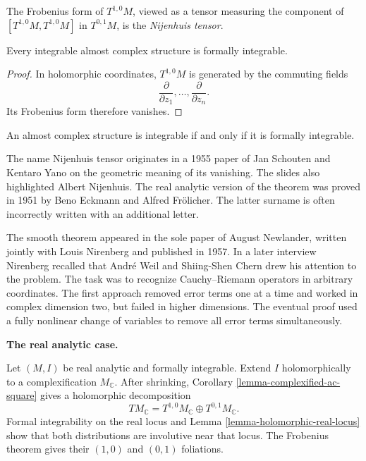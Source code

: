 \begin{definition}
\label{definition-nijenhuis-tensor}
The Frobenius form of $T^{1,0}M$, viewed as
a tensor measuring the component of
$[T^{1,0}M,T^{1,0}M]$ in $T^{0,1}M$, is the
{\it Nijenhuis tensor}.
\end{definition}

\begin{proposition}
\label{proposition-integrable-formal}
Every integrable almost complex structure is
formally integrable.
\end{proposition}

\begin{proof}
In holomorphic coordinates,
$T^{1,0}M$ is generated by the commuting
fields
$$
\frac{\partial}{\partial z_1},\ldots,
\frac{\partial}{\partial z_n}.
$$
Its Frobenius form therefore vanishes.
\end{proof}

\begin{theorem}
\label{theorem-newlander-nirenberg}
An almost complex structure is integrable
if and only if it is formally integrable.
\end{theorem}

The name Nijenhuis tensor originates in a
1955 paper of Jan Schouten and Kentaro Yano
on the geometric meaning of its vanishing.
The slides also highlighted Albert Nijenhuis.
The real analytic version of the theorem was
proved in 1951 by Beno Eckmann and Alfred
Fr\"olicher. The latter surname is often
incorrectly written with an additional
letter.

The smooth theorem appeared in the sole
paper of August Newlander, written jointly
with Louis Nirenberg and published in 1957.
In a later interview Nirenberg recalled that
Andr\'e Weil and Shiing-Shen Chern drew his
attention to the problem. The task was to
recognize Cauchy--Riemann operators in
arbitrary coordinates. The first approach
removed error terms one at a time and worked
in complex dimension two, but failed in
higher dimensions. The eventual proof used
a fully nonlinear change of variables to
remove all error terms simultaneously.

\medskip\noindent
{\bf The real analytic case.}

Let $(M,I)$ be real analytic and formally
integrable. Extend $I$ holomorphically to a
complexification $M_{\mathbb{C}}$. After
shrinking, Corollary
\ref{lemma-complexified-ac-square} gives a
holomorphic decomposition
$$
TM_{\mathbb{C}}
=T^{1,0}M_{\mathbb{C}}
\oplus T^{0,1}M_{\mathbb{C}}.
$$
Formal integrability on the real locus and
Lemma \ref{lemma-holomorphic-real-locus}
show that both distributions are involutive
near that locus. The Frobenius theorem gives
their $(1,0)$ and $(0,1)$ foliations.

